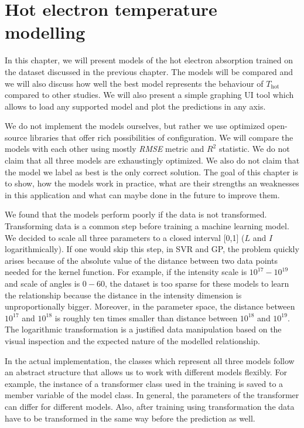 \chapter{Hot electron temperature modelling}
\label{ch:models-impl}

In this chapter, we will present models of the hot electron absorption trained on the dataset discussed in the previous chapter. The models will be compared and we will also discuss how well the best model represents the behaviour of $T_{\mathrm{hot}}$ compared to other studies. We will also present a simple graphing UI tool which allows to load any supported model and plot the predictions in any axis.

We do not implement the models ourselves, but rather we use optimized open-source libraries that offer rich possibilities of configuration. We will compare the models with each other using mostly \textit{RMSE} metric and $R^2$ statistic. We do not claim that all three models are exhaustingly optimized. We also do not claim that the model we label as best is the only correct solution. The goal of this chapter is to show, how the models work in practice, what are their strengths an weaknesses in this application and what can maybe done in the future to improve them.

We found that the models perform poorly if the data is not transformed. Transforming data is a common step before training a machine learning model. We decided to scale all three parameters to a closed interval [0,1] ($L$ and $I$ logarithmically). If one would skip this step, in SVR and GP, the problem quickly arises because of the absolute value of the distance between two data points needed for the kernel function. For example, if the intensity scale is $10^{17} - 10^{19}$ and scale of angles is $0-60$, the dataset is too sparse for these models to learn the relationship because the distance in the intensity dimension is unproportionally bigger. Moreover, in the parameter space, the distance between $10^{17}$ and $10^{18}$ is roughly ten times smaller than distance between $10^{18}$ and $10^{19}$. The logarithmic transformation is a justified data manipulation based on the visual inspection and the expected nature of the modelled relationship.

In the actual implementation, the classes which represent all three models follow an abstract structure that allows us to work with different models flexibly. For example, the instance of a transformer class used in the training is saved to a member variable of the model class. In general, the parameters of the transformer can differ for different models. Also, after training using transformation the data have to be transformed in the same way before the prediction as well.

